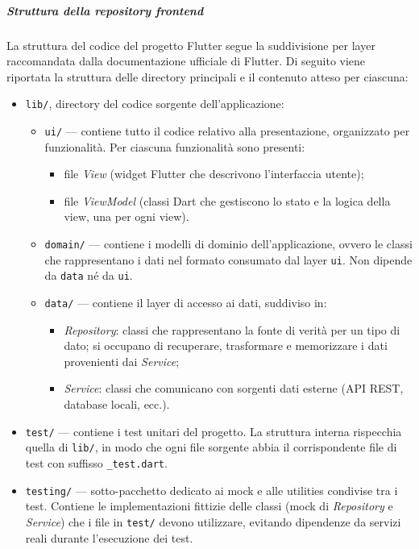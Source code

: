 \documentclass[a4paper,12pt]{article}
\begin{document}
\subparagraph{Struttura della repository frontend} \label{subpar:struttura-repo-frontend}
La struttura del codice del progetto Flutter segue la suddivisione per layer raccomandata dalla documentazione ufficiale di Flutter. 
Di seguito viene riportata la struttura delle directory principali e il contenuto atteso per ciascuna:
\begin{itemize}
    \item \texttt{lib/}, directory del codice sorgente dell'applicazione:
    \begin{itemize}
        \item \texttt{ui/} — contiene tutto il codice relativo alla presentazione, organizzato per funzionalità. Per ciascuna funzionalità sono presenti:
        \begin{itemize}
            \item file \textit{View} (widget Flutter che descrivono l'interfaccia utente);
            \item file \textit{ViewModel} (classi Dart che gestiscono lo stato e la logica della view, una per ogni view).
        \end{itemize}
        \item \texttt{domain/} — contiene i modelli di dominio dell'applicazione, ovvero le classi che rappresentano i dati nel formato consumato dal layer \texttt{ui}. Non dipende da \texttt{data} né da \texttt{ui}.
        \item \texttt{data/} — contiene il layer di accesso ai dati, suddiviso in:
        \begin{itemize}
            \item \textit{Repository}: classi che rappresentano la fonte di verità per un tipo di dato; si occupano di recuperare, trasformare e memorizzare i dati provenienti dai \textit{Service};
            \item \textit{Service}: classi che comunicano con sorgenti dati esterne (API REST, database locali, ecc.).
        \end{itemize}
    \end{itemize}
    \item \texttt{test/} — contiene i test unitari del progetto. La struttura interna rispecchia quella di \texttt{lib/}, in modo che ogni file sorgente abbia il corrispondente file di test con suffisso \texttt{\_test.dart}.
    \item \texttt{testing/} — sotto-pacchetto dedicato ai mock e alle utilities condivise tra i test. Contiene le implementazioni fittizie delle classi (mock di \textit{Repository} e \textit{Service}) che i file in \texttt{test/} devono utilizzare, evitando dipendenze da servizi reali durante l'esecuzione dei test.
\end{itemize}
\end{document}
